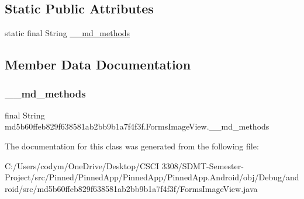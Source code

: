 \subsection*{Static Public Attributes}
\begin{DoxyCompactItemize}
\item 
static final String \hyperlink{classmd5b60ffeb829f638581ab2bb9b1a7f4f3f_1_1_forms_image_view_a25caf4e2fd079c6fac24434fed5d06d0}{\+\_\+\+\_\+md\+\_\+methods}
\end{DoxyCompactItemize}


\subsection{Member Data Documentation}
\mbox{\label{classmd5b60ffeb829f638581ab2bb9b1a7f4f3f_1_1_forms_image_view_a25caf4e2fd079c6fac24434fed5d06d0}} 
\subsubsection{\texorpdfstring{\+\_\+\+\_\+md\+\_\+methods}{\_\_md\_methods}}
{\footnotesize\ttfamily final String md5b60ffeb829f638581ab2bb9b1a7f4f3f.\+Forms\+Image\+View.\+\_\+\+\_\+md\+\_\+methods\hspace{0.3cm}{\ttfamily [static]}}



The documentation for this class was generated from the following file\+:\begin{DoxyCompactItemize}
\item 
C\+:/\+Users/codym/\+One\+Drive/\+Desktop/\+C\+S\+C\+I 3308/\+S\+D\+M\+T-\/\+Semester-\/\+Project/src/\+Pinned/\+Pinned\+App/\+Pinned\+App/\+Pinned\+App.\+Android/obj/\+Debug/android/src/md5b60ffeb829f638581ab2bb9b1a7f4f3f/Forms\+Image\+View.\+java\end{DoxyCompactItemize}
